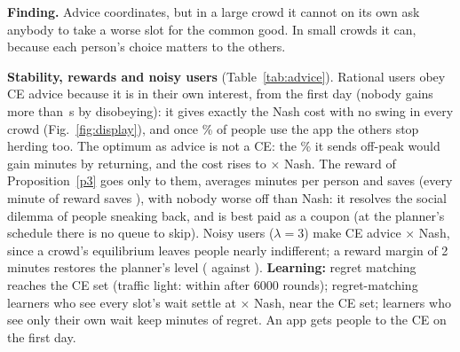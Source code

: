 \documentclass{article}
\newcommand{\finding}[1]{\par\smallskip\noindent\colorbox{cCE!7}{\parbox{\dimexpr\linewidth-2\fboxsep}{\small\textbf{Finding.} #1}}\par\smallskip}
\begin{document}
\finding{Advice coordinates, but in a large crowd it cannot on its own ask anybody to take a worse slot for the
common good. In small crowds it can, because each person's choice matters to the others.}

\begin{table}[t]\centering\small
\caption{Can any CE beat Nash? Real game: best CE over about 25 schedules. Large crowd: the best-response face
(``cheapest'': its cheapest schedule, not obeyed) and the best CE's saving over Nash at three obedience tolerances.
Minutes per person unless stated.}\label{tab:ce}

\end{table}

\textbf{Stability, rewards and noisy users} (Table~\ref{tab:advice}). Rational users obey CE advice because it is in their own
interest, from the first day (nobody gains more than \RceGainRange\,s by disobeying): it gives exactly the Nash cost with no swing in every crowd (Fig.~\ref{fig:display}),
and once \RcomplRange\% of people use the app the others stop herding too. The optimum as advice is not a CE: the
\RtemptRange\% it sends off-peak would gain \RoptGainRange{} minutes by returning, and the cost rises to
\RoptAdvRange$\times$ Nash. The reward of Proposition~\ref{p3} goes only to them, averages \RrewardRange{} minutes per
person and saves \RsavingRange{} (every minute of reward saves \RbuyRange), with nobody worse off than Nash: it resolves the social dilemma of people sneaking back,
and is best paid as a coupon (at the planner's schedule there is no queue to skip). Noisy users ($\lambda=3$) make CE
advice \RnoisyCE$\times$ Nash, since a crowd's equilibrium leaves people nearly indifferent; a reward margin of 2
minutes restores the planner's level (\RnoisyRtwo{} against \RoptRel). \textbf{Learning:} regret matching reaches the CE set (traffic light: within
\RrmGap{} after 6000 rounds); regret-matching learners who see every slot's wait settle at \RrmRange$\times$ Nash, near the CE set; learners who see only their own wait keep
\RexpRegret{} minutes of regret. An app gets people to the CE on the first day.

\begin{table}[t]\centering\small
\caption{Making advice work. Left: the price of obedience for the optimum (minutes per person; people worse off than
under Nash without / with the reward). Right: noisy app users ($\lambda=3$), cost relative to Nash, \RnoisySeeds{} seeds.}\label{tab:advice}

\end{table}
\end{document}
